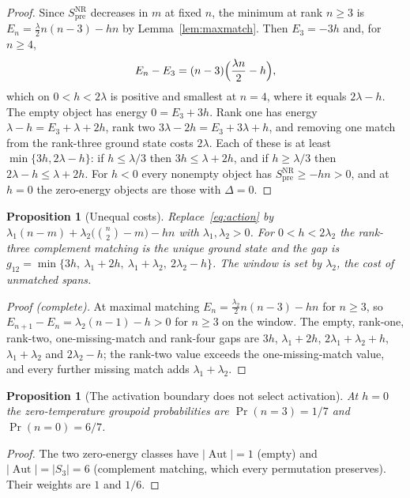 \documentclass[11pt]{article}
\newtheorem{proposition}[theorem]{Proposition}
\theoremstyle{definition}
\theoremstyle{remark}
\newcommand{\Spre}{S^{\mathrm{NR}}_{\mathrm{pre}}}
\newcommand{\Aut}{\operatorname{Aut}}
\begin{document}
\begin{proof}
Since $\Spre$ decreases in $m$ at fixed $n$, the minimum at rank $n\ge3$ is
$E_n=\frac{\lambda}{2}n(n-3)-hn$ by Lemma~\ref{lem:maxmatch}. Then $E_3=-3h$ and, for
$n\ge4$,
\begin{equation}
E_n-E_3=(n-3)\Bigl(\frac{\lambda n}{2}-h\Bigr),
\label{eq:diff}
\end{equation}
which on $0<h<2\lambda$ is positive and smallest at $n=4$, where it equals $2\lambda-h$.
The empty object has energy $0=E_3+3h$. Rank one has energy $\lambda-h=E_3+\lambda+2h$,
rank two $3\lambda-2h=E_3+3\lambda+h$, and removing one match from the rank-three ground
state costs $2\lambda$. Each of these is at least $\min\{3h,2\lambda-h\}$: if
$h\le\lambda/3$ then $3h\le\lambda+2h$, and if $h\ge\lambda/3$ then
$2\lambda-h\le\lambda+2h$. For $h<0$ every nonempty object has $\Spre\ge-hn>0$, and at
$h=0$ the zero-energy objects are those with $\Delta=0$.
\end{proof}

\begin{proposition}[Unequal costs]
\label{prop:unequal}
Replace~\eqref{eq:action} by $\lambda_1(n-m)+\lambda_2\bigl(\binom n2-m\bigr)-hn$ with
$\lambda_1,\lambda_2>0$. For $0<h<2\lambda_2$ the rank-three complement matching is the
unique ground state and the gap is
$g_{12}=\min\{3h,\ \lambda_1+2h,\ \lambda_1+\lambda_2,\ 2\lambda_2-h\}$. The window is set
by $\lambda_2$, the cost of unmatched spans.
\end{proposition}

\begin{proof}[Proof (complete)]
At maximal matching $E_n=\frac{\lambda_2}{2}n(n-3)-hn$ for $n\ge3$, so $E_{n+1}-E_n=
\lambda_2(n-1)-h>0$ for $n\ge3$ on the window. The empty, rank-one, rank-two,
one-missing-match and rank-four gaps are $3h$, $\lambda_1+2h$, $2\lambda_1+\lambda_2+h$,
$\lambda_1+\lambda_2$ and $2\lambda_2-h$; the rank-two value exceeds the
one-missing-match value, and every further missing match adds $\lambda_1+\lambda_2$.
\end{proof}

\begin{proposition}[The activation boundary does not select activation]
\label{prop:boundary}
At $h=0$ the zero-temperature groupoid probabilities are $\Pr(n=3)=1/7$ and
$\Pr(n=0)=6/7$.
\end{proposition}

\begin{proof}
The two zero-energy classes have $|\Aut|=1$ (empty) and $|\Aut|=|S_3|=6$ (complement
matching, which every permutation preserves). Their weights are $1$ and $1/6$.
\end{proof}
\end{document}
